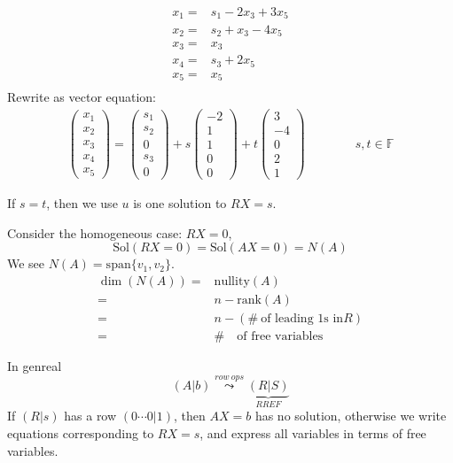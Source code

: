 \documentclass[12pt]{article}
\theoremstyle{plain}
\newcommand{\Span}{\mathrm{span}}
\newcommand{\rank}{\mathrm{rank}}
\newcommand{\nullity}{\mathrm{nullity}}
\newcommand{\Sol}{\mathrm{Sol}}
\newcommand{\mF}{{\mathbb{F}}}
\begin{document}
{	\begin{align*}
		x_1 =& s_1 - 2x_3 + 3x_5	\\
		x_2 =& s_2 + x_3 - 4x_5		\\
		x_3 =& x_3					\\
		x_4 =& s_3 + 2x_5			\\
		x_5 =& x_5					\\
	\end{align*}
	Rewrite as vector equation: 
	\begin{align*}
		\begin{pmatrix}
			x_1	\\
			x_2	\\
			x_3	\\
			x_4	\\
			x_5
		\end{pmatrix}
		= 
		\begin{pmatrix}
			s_1	\\
			s_2	\\
			0	\\
			s_3	\\
			0
		\end{pmatrix}
		+
		s
		\begin{pmatrix}
			-2	\\
			1	\\
			1	\\
			0	\\
			0	
		\end{pmatrix}
		+ 
		t
		\begin{pmatrix}
			3	\\
			-4	\\
			0	\\
			2	\\
			1
		\end{pmatrix}
		\qquad \qquad s,t \in \mF
	\end{align*}

	If $s = t$, then we use $u$ is one solution to $RX = s$. 

	Consider the homogeneous case: $RX = 0$,
	\[
		\Sol(RX = 0) = \Sol(AX = 0) = N(A)
	\]
	We see $N(A) = \Span\{v_1, v_2\}$. 
	\begin{align*}
		\dim(N(A)) 
		=& \nullity(A)	\\
		=& n -\rank(A)	\\
		=& n - (\#\  \text{of leading 1s in} R)	\\
		=& \# \quad \text{of free variables}
	\end{align*}
}
In genreal 
\[
	(A|b) \overset{row \ ops}{\leadsto} \underbrace{(R|S)}_{RREF}
\]
If $(R|s)$ has a row $(0 \cdots 0 | 1)$, then $AX=b$ has no solution, 
otherwise we write equations corresponding to $RX=s$, and express all 
variables in terms of free variables. 
\end{document}
